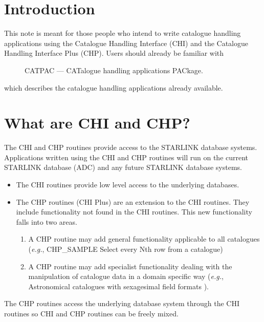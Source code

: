 \documentclass[11pt,nolof]{starlink}
\begin{document}
\scfrontmatter

\section {Introduction}

This note is meant for those people who intend to write catalogue handling
applications using the
Catalogue Handling Interface (CHI) and the Catalogue Handling Interface Plus
(CHP). Users should already be familiar with

\begin {description}

\item []  CATPAC --- CATalogue handling applications PACkage.

\end {description}

which describes the catalogue handling applications already available.

\section {What are CHI and CHP?}

The CHI and CHP routines provide access to the STARLINK database systems.
Applications written using the CHI and CHP routines will
run on the current STARLINK database (ADC) and any future STARLINK database
systems.
\begin{itemize}
   \item The CHI routines provide low level access to the underlying databases.
   \item The CHP routines (CHI Plus) are an extension to the CHI routines.
They include
functionality not found in the CHI routines.
This new functionality falls into two areas.
\begin{enumerate}
  \item A CHP routine may add general functionality applicable
to all catalogues (\emph{e.g.}, CHP\_SAMPLE Select every Nth row from a catalogue)
  \item A CHP routine may add specialist functionality dealing with the
manipulation of catalogue data in a domain specific way
(\emph{e.g.}, Astronomical catalogues with sexagesimal
field formats ).
\end{enumerate}
\end{itemize}
The CHP routines access the underlying database system through the CHI routines
so CHI and CHP routines can be freely mixed.
\end{document}
